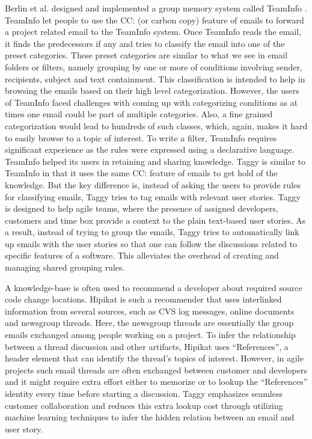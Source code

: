 Berlin et al. designed and implemented a group memory system called TeamInfo \cite{where_did_you}. TeamInfo let people to use the CC: (or carbon copy) feature of emails to forward a project related email to the TeamInfo system. Once TeamInfo reads the email, it finds the predecessors if any and tries to classify the email into one of the preset categories. These preset categories are similar to what we see in email folders or filters, namely grouping by one or more of conditions involving sender, recipients, subject and text containment. This classification is intended to help in browsing the emails based on their high level categorization. However, the users of TeamInfo faced challenges with coming up with categorizing conditions as at times one email could be part of multiple categories. Also, a fine grained categorization would lead to hundreds of such classes, which, again, makes it hard to easily browse to a topic of interest. To write a filter, TeamInfo requires significant experience as the rules were expressed using a declarative language. TeamInfo helped its users in retaining and sharing knowledge. Taggy is similar to TeamInfo in that it uses the same CC: feature of emails to get hold of the knowledge. But the key difference is, instead of asking the users to provide rules for classifying emails, Taggy tries to tag emails with relevant user stories. Taggy is designed to help agile teams, where the presence of assigned developers, customers and time box provide a context to the plain text-based user stories. As a result, instead of trying to group the emails, Taggy tries to automatically link up emails with the user stories so that one can follow the discussions related to specific features of a software. This alleviates the overhead of creating and managing shared grouping rules.

A knowledge-base is often used to recommend a developer about required source code change locations. Hipikat is such a recommender that uses interlinked information from several sources, such as CVS log messages, online documents and newsgroup threads\cite{hipikat}. Here, the newsgroup threads are essentially the group emails exchanged among people working on a project. To infer the relationship between a thread discussion and other artifacts, Hipikat uses ``References'', a header element that can identify the thread's topics of interest. However, in agile projects such email threads are often exchanged between customer and developers and it might require extra effort either to memorize or to lookup the ``References'' identity every time before starting a discussion. Taggy emphasizes seamless customer collaboration and reduces this extra lookup cost through utilizing machine learning techniques to infer the hidden relation between an email and user story.

